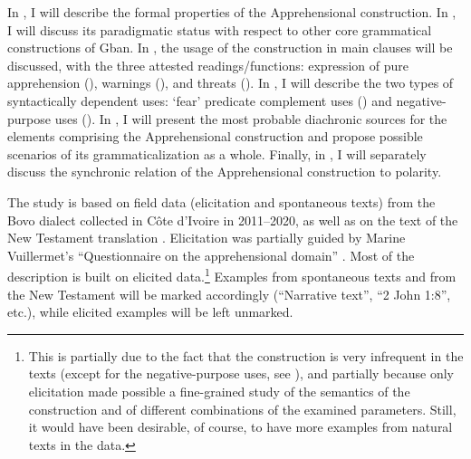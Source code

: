 \documentclass[output=paper,colorlinks,citecolor=brown
]{langscibook}
\begin{document}
In , I will describe the formal properties of the Apprehensional construction. In , I will discuss its paradigmatic status with respect to other core grammatical constructions of Gban. In , the usage of the construction in main clauses will be discussed, with the three attested readings\slash functions: expression of pure apprehension (), warnings (), and threats (). In , I will describe the two types of syntactically dependent uses: `fear' predicate complement uses () and negative-purpose uses (). In , I will present the most probable diachronic sources for the elements comprising the Apprehensional construction and propose possible scenarios of its grammaticalization as a whole. Finally, in , I will separately discuss the synchronic relation of the Apprehensional construction to polarity.


The study is based on field data (elicitation and spontaneous texts) from the Bovo dialect collected in Côte d'Ivoire in 2011--2020, as well as on the text of the New Testament translation \citep{gbanNT}. Elicitation was partially guided by Marine Vuillermet's ``Questionnaire on the apprehensional domain'' \citep{chapters/vuillermet}. Most of the description is built on elicited data.\footnote{This is partially due to the fact that the construction is very infrequent in the texts (except for the negative-purpose uses, see ), and partially because only elicitation made possible a fine-grained study of the semantics of the construction and of different combinations of the examined parameters. Still, it would have been desirable, of course, to have more examples from natural texts in the data.} Examples from spontaneous texts and from the New Testament will be marked accordingly (``Narrative text'', ``2 John 1:8'', etc.), while elicited examples will be left unmarked.
\end{document}
